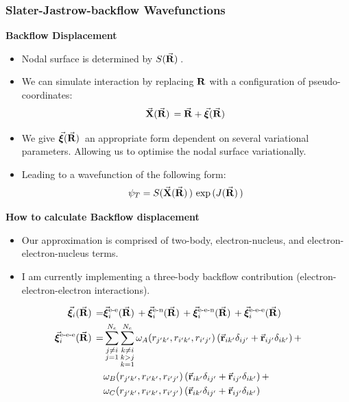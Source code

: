 \documentclass[10pt]{beamer}
\newcommand{\bmva}[1]{\vec{\bm#1}}
\begin{document}
\begin{frame}[allowframebreaks]
    \frametitle{Slater-Jastrow-backflow Wavefunctions}
    \textbf{Backflow Displacement}
    \begin{itemize}
        \item[\textbullet] Nodal surface is determined by $S\pqty*{\va{R}}$.
        \item[\textbullet] We can simulate interaction by replacing $\vb{R}$ with a configuration of pseudo-coordinates:
        \begin{equation}
            \va{X}\pqty*{\va{R}}=\va{R}+\bmva{\xi}\pqty*{\va{R}}
        \end{equation}
        \item[\textbullet] We give $\bmva{\xi}\pqty*{\va{R}}$ an appropriate form dependent on several variational parameters. Allowing us to optimise the nodal surface variationally\cite{LopezRios2006}.
        \item[\textbullet] Leading to a wavefunction of the following form:
        \begin{equation}
            \psi_T=S\pqty*{\va{X}\pqty*{\va{R}}}\exp\pqty*{J\pqty*{\va{R}}}
        \end{equation}
    \end{itemize}
    \framebreak%

    \textbf{How to calculate Backflow displacement}
    \begin{itemize}
        \item[\textbullet] Our approximation is comprised of two-body, electron-nucleus, and electron-electron-nucleus terms.
        \item[\textbullet] I am currently implementing a three-body backflow contribution (electron-electron-electron interactions).
    \end{itemize}
    \framebreak%

    \begin{align}
        \bmva{\xi}_i\pqty*{\va{R}}=&
        \bmva{\xi}_i^{\text{e-e}}\pqty*{\va{R}}+
        \bmva{\xi}_i^{\text{e-n}}\pqty*{\va{R}}+
        \bmva{\xi}_i^{\text{e-e-n}}\pqty*{\va{R}}+
        \bmva{\xi}_i^{\text{e-e-e}}\pqty*{\va{R}}
        \\
        \bmva{\xi}_i^{\text{e-e-e}}\pqty*{\va{R}}=&
        \sum\limits_{\substack{j\neq i\\j=1}}^{N_e}
        \sum\limits_{\substack{k\neq i\\k>j\\k=1}}^{N_e}
        \omega_A\pqty*{r_{j'k'},r_{i'k'},r_{i'j'}}
        \pqty*{\va{r}_{ik'}\delta_{ij'}+\va{r}_{ij'}\delta_{ik'}}+\nonumber\\
        &\omega_B\pqty*{r_{j'k'},r_{i'k'},r_{i'j'}}
        \pqty*{\va{r}_{ik'}\delta_{ij'}+\va{r}_{ij'}\delta_{ik'}}+\nonumber\\
        &\omega_C\pqty*{r_{j'k'},r_{i'k'},r_{i'j'}}
        \pqty*{\va{r}_{ik'}\delta_{ij'}+\va{r}_{ij'}\delta_{ik'}}
    \end{align}
    \framebreak%


\end{frame}
\end{document}
